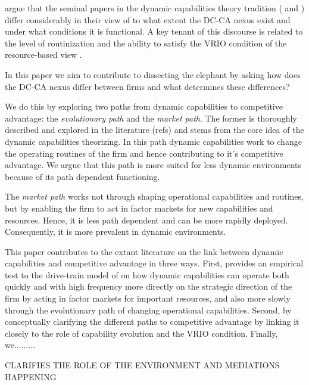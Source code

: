 \documentclass[review,fleqn]{elsarticle}\usepackage[]{graphicx}\usepackage[]{color}
\begin{document}
\cite{Peteraf2013} argue that the seminal papers in the dynamic capabilities theory
tradition (\cite{Teece1997} and \cite{Eisenhardt2000}) differ considerably in their view
of to what extent the DC-CA nexus exist and under what conditions it is functional. A key
tenant of this discourse is related to the level of routinization and the ability to
satisfy the VRIO condition \citep{Barney1991a} of the resource-based view
\citep{Peteraf2013}.

In this paper we aim to contribute to dissecting the elephant by asking how does the DC-CA
nexus differ between firms and what determines these differences?

We do this by exploring two paths from dynamic capabilities to competitive advantage: the
\emph{evolutionary path} and the \emph{market path}. The former is thoroughly described
and explored in the literature (refs) and stems from the core idea of the dynamic
capabilities theorizing. In this path dynamic capabilities work to change the operating
routines of the firm and hence contributing to it's competitive advantage. We argue that
this path is more suited for less dynamic environments because of its path dependent
functioning.

The \emph{market path} works not through shaping operational capabilities and routines,
but by enabling the firm to act in factor markets for new capabilities and
resources. Hence, it is less path dependent and can be more rapidly
deployed. Consequently, it is more prevalent in dynamic environments.

This paper contributes to the extant literature on the link between dynamic capabilities
and competitive advantage in three ways. First, provides an empirical test to the
drive-train model of \cite{DiStefano2014} on how dynamic capabilities can operate both
quickly and with high frequency more directly on the strategic direction of the firm by
acting in factor markets for important resources, and also more slowly through the
evolutionary path of changing operational capabilities. Second, by conceptually clarifying
the different paths to competitive advantage by linking it closely to the role of
capability evolution and the VRIO condition. Finally, we.........

CLARIFIES THE ROLE OF THE ENVIRONMENT AND MEDIATIONS HAPPENING


\end{document}

